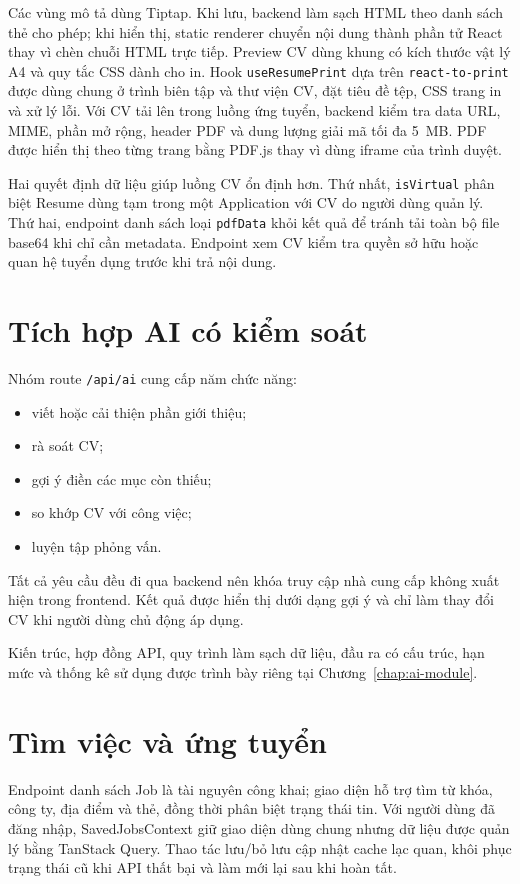 Các vùng mô tả dùng Tiptap. Khi lưu, backend làm sạch HTML theo danh sách thẻ cho phép; khi hiển thị, static renderer chuyển nội dung thành phần tử React thay vì chèn chuỗi HTML trực tiếp. Preview CV dùng khung có kích thước vật lý A4 và quy tắc CSS dành cho in. Hook \texttt{useResumePrint} dựa trên \texttt{react-to-print} được dùng chung ở trình biên tập và thư viện CV, đặt tiêu đề tệp, CSS trang in và xử lý lỗi. Với CV tải lên trong luồng ứng tuyển, backend kiểm tra data URL, MIME, phần mở rộng, header PDF và dung lượng giải mã tối đa 5~MB. PDF được hiển thị theo từng trang bằng PDF.js thay vì dùng iframe của trình duyệt.

Hai quyết định dữ liệu giúp luồng CV ổn định hơn. Thứ nhất, \texttt{isVirtual} phân biệt Resume dùng tạm trong một Application với CV do người dùng quản lý. Thứ hai, endpoint danh sách loại \texttt{pdfData} khỏi kết quả để tránh tải toàn bộ file base64 khi chỉ cần metadata. Endpoint xem CV kiểm tra quyền sở hữu hoặc quan hệ tuyển dụng trước khi trả nội dung.

\section{Tích hợp AI có kiểm soát}

Nhóm route \texttt{/api/ai} cung cấp năm chức năng:

\begin{itemize}
    \item viết hoặc cải thiện phần giới thiệu;
    \item rà soát CV;
    \item gợi ý điền các mục còn thiếu;
    \item so khớp CV với công việc;
    \item luyện tập phỏng vấn.
\end{itemize}

Tất cả yêu cầu đều đi qua backend nên khóa truy cập nhà cung cấp không xuất hiện trong frontend. Kết quả được hiển thị dưới dạng gợi ý và chỉ làm thay đổi CV khi người dùng chủ động áp dụng.

Kiến trúc, hợp đồng API, quy trình làm sạch dữ liệu, đầu ra có cấu trúc, hạn mức và thống kê sử dụng được trình bày riêng tại Chương~\ref{chap:ai-module}.

\section{Tìm việc và ứng tuyển}

Endpoint danh sách Job là tài nguyên công khai; giao diện hỗ trợ tìm từ khóa, công ty, địa điểm và thẻ, đồng thời phân biệt trạng thái tin. Với người dùng đã đăng nhập, SavedJobsContext giữ giao diện dùng chung nhưng dữ liệu được quản lý bằng TanStack Query. Thao tác lưu/bỏ lưu cập nhật cache lạc quan, khôi phục trạng thái cũ khi API thất bại và làm mới lại sau khi hoàn tất.


